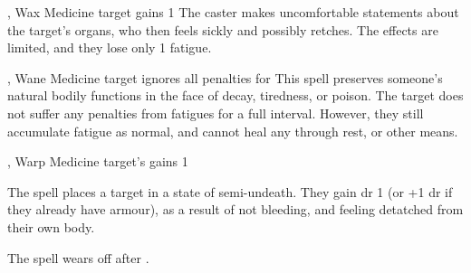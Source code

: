   {\mFate, \mAir}%
  {Wax}%
  {}%
  {Medicine}%
  {target gains 1 }%
  {
    The caster makes uncomfortable statements about the target's organs, who then feels sickly and possibly retches.
    The effects are limited, and they lose only 1 \gls{fatigue}.
  }

  {\mFate, \mAir}%
  {Wane}%
  {}%
  {Medicine}%
  {target ignores all  penalties for }%
  {
    This spell preserves someone's natural bodily functions in the face of decay, tiredness, or poison.
    The target does not suffer any penalties from \glspl{fatigue} for a full \gls{interval}.
    However, they still accumulate \gls{fatigue} as normal, and cannot heal any through rest, or other means.
  }

  {\mFate, \mAir}%
  {Warp}%
  {}%
  {Medicine}%
  {target's gains  1}%
  {
    The spell places a target in a state of semi-undeath.
    They gain \gls{dr} 1 (or +1 \gls{dr} if they already have armour), as a result of not bleeding, and feeling detatched from their own body.

    The spell wears off after .
  }

